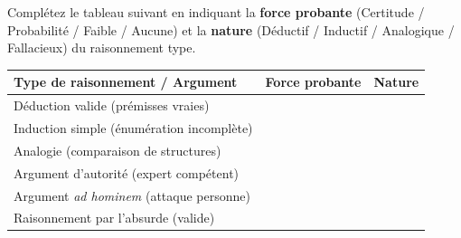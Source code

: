 \documentclass[11pt]{article}
\begin{document}
\begin{exercice}
Complétez le tableau suivant en indiquant la \textbf{force probante} (Certitude / Probabilité / Faible / Aucune) et la \textbf{nature} (Déductif / Inductif / Analogique / Fallacieux) du raisonnement type.
\begin{center}
\begin{tabularx}{\linewidth}{|X|c|c|}
\hline
\textbf{Type de raisonnement / Argument} & \textbf{Force probante} & \textbf{Nature} \\ \hline
Déduction valide (prémisses vraies) &  &  \\ \hline
Induction simple (énumération incomplète) &  &  \\ \hline
Analogie (comparaison de structures) &  &  \\ \hline
Argument d'autorité (expert compétent) &  &  \\ \hline
Argument \textit{ad hominem} (attaque personne) &  &  \\ \hline
Raisonnement par l'absurde (valide) &  &  \\ \hline
\end{tabularx}
\end{center}
\end{exercice}
\end{document}
